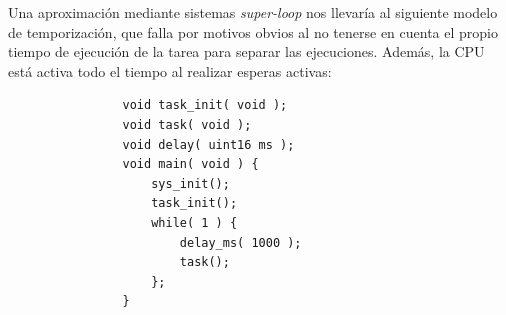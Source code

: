 \documentclass[../main.tex]{subfiles}
\begin{document}
            Una aproximación mediante sistemas \emph{super-loop} nos llevaría al siguiente modelo de temporización, que falla por motivos obvios al no tenerse en cuenta el propio tiempo de ejecución de la tarea para separar las ejecuciones. Además, la CPU está activa todo el tiempo al realizar esperas activas:

            \begin{lstlisting}
                void task_init( void ); 
                void task( void ); 
                void delay( uint16 ms ); 
                void main( void ) { 
                    sys_init(); 
                    task_init(); 
                    while( 1 ) { 
                        delay_ms( 1000 ); 
                        task(); 
                    }; 
                }    
            \end{lstlisting}
\end{document}
